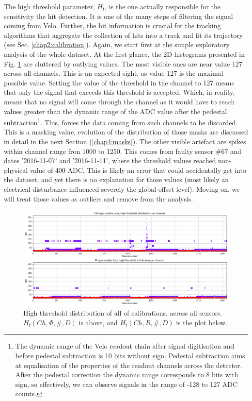 The high threshold parameter, $H_{t}$, is the one actually responsible for the sensitivity the hit detection. It is one of the many steps of filtering the signal coming from Velo. Further, the hit information is crucial for the tracking algorithms that aggregate the collection of hits into a track and fit its trajectory (see Sec. \ref{chap2:calibration}).
Again, we start first at the simple exploratory analysis of the whole dataset. At the first glance, the 2D histograms presented in Fig. \ref{plot:part2-threshold-all} are cluttered by outlying values.
The most visible ones are near value 127 across all channels.
This is an expected sight, as value 127 is the maximal possible value.
Setting the value of the threshold in the channel to 127 means that only the signal that exceeds this threshold is accepted. Which, in reality, means that no signal will come through the channel as it would have to reach values greater than the dynamic range of the ADC value after the pedestal subtraction\footnote{The dynamic range of the Velo readout chain after signal digitisation and before pedestal subtraction is 10 bits without sign. Pedestal subtraction aims at equalisation of the properties of the readout channels across the detector. After the pedestal correction the dynamic range corresponds to 8 bits with sign, so effectively, we can observe signals in the range of -128 to 127 ADC counts.}. This, forces the data coming from such channels to be discarded.
This is a masking value, evolution of the distribution of those masks are discussed in detail in the next Section (\ref{chap4:masks}).
The other visible artefact are spikes within channel range fron 1000 to 1250.
This comes from faulty  sensor  \#67  and  dates  ’2016-11-07’  and  ’2016-11-11’,  where  the  threshold  values  reached non-physical value of 400  ADC. This is likely an error that could accidentally get into the dataset, and yet there is no explanation for those values (most likely an electrical disturbance influenced severely the global offset level).
Moving on, we will treat those values as outliers and remove from the analysis.

\begin{figure}
    \centering
    \includegraphics[width=0.7\linewidth]{figures/chapter4/calib_analysis/P2-threshold-all-r-phi.png}
    \caption{High threshold distribution of all of calibrations, across all sensors. $H_t(Ch,\Phi,\#, D)$ is above, and $H_t(Ch,R,\#, D)$ is the plot below.}
    \label{plot:part2-threshold-all}
\end{figure}


